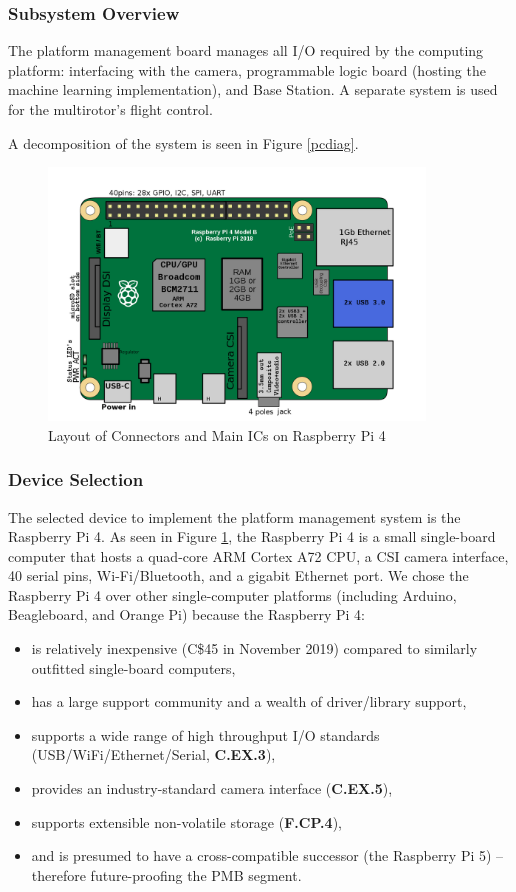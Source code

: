 \subsubsection{Subsystem Overview}
The platform management board manages all I/O required by the computing platform: interfacing with the camera, programmable logic board (hosting the machine learning implementation), and Base Station. A separate system is used for the multirotor's flight control.

A decomposition of the system is seen in Figure \ref{pcdiag}.

\begin{figure}[H]
\centering
\includegraphics[width=10cm]{img/RaspberryPi_Model_4B.png}
\caption[Layout of Connectors and Main ICs on Raspberry Pi 4]{Layout of Connectors and Main ICs on Raspberry Pi 4\cite{rpidiag}}
\label{rpi}
\end{figure}

\subsubsection{Device Selection}

The selected device to implement the platform management system is the Raspberry Pi 4. As seen in Figure \ref{rpi}, the Raspberry Pi 4 is a small single-board computer that hosts a quad-core ARM Cortex A72 CPU, a CSI camera interface, 40 serial pins, Wi-Fi/Bluetooth, and a gigabit Ethernet port. We chose the Raspberry Pi 4 over other single-computer platforms (including Arduino, Beagleboard, and Orange Pi) because the Raspberry Pi 4:

\begin{itemize}
\item is relatively inexpensive (C\$45 in November 2019) compared to similarly outfitted single-board computers,
\item has a large support community and a wealth of driver/library support,
\item supports a wide range of high throughput I/O standards (USB/WiFi/Ethernet/Serial, \textbf{C.EX.3}),
\item provides an industry-standard camera interface (\textbf{C.EX.5}),
\item supports extensible non-volatile storage (\textbf{F.CP.4}),
\item and is presumed to have a cross-compatible successor (the Raspberry Pi 5) -- therefore future-proofing the PMB segment.
\end{itemize} 

